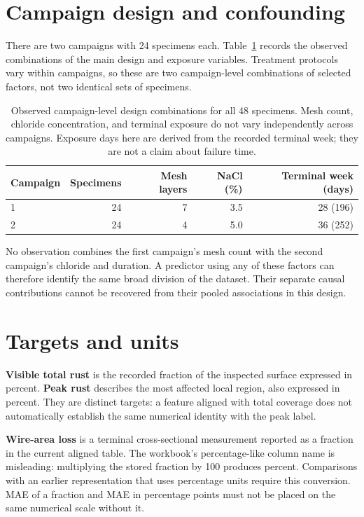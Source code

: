 \section{Campaign design and confounding}
There are two campaigns with 24 specimens each. Table~\ref{tab:design} records the observed combinations of the main design and exposure variables. Treatment protocols vary within campaigns, so these are two campaign-level combinations of selected factors, not two identical sets of specimens.
\begin{table}[htbp]\centering
\caption[Observed campaign design combinations]{Observed campaign-level design combinations for all 48 specimens. Mesh count, chloride concentration, and terminal exposure do not vary independently across campaigns. Exposure days here are derived from the recorded terminal week; they are not a claim about failure time.}\label{tab:design}
\begin{tabular}{lrrrr}\toprule
Campaign & Specimens & Mesh layers & NaCl (\%) & Terminal week (days)\\\midrule
1 & 24 & 7 & 3.5 & 28 (196)\\
2 & 24 & 4 & 5.0 & 36 (252)\\\bottomrule
\end{tabular}
\end{table}
No observation combines the first campaign's mesh count with the second campaign's chloride and duration. A predictor using any of these factors can therefore identify the same broad division of the dataset. Their separate causal contributions cannot be recovered from their pooled associations in this design.

\section{Targets and units}\label{sec:targets}
\textbf{Visible total rust} is the recorded fraction of the inspected surface expressed in percent. \textbf{Peak rust} describes the most affected local region, also expressed in percent. They are distinct targets: a feature aligned with total coverage does not automatically establish the same numerical identity with the peak label.

\textbf{Wire-area loss} is a terminal cross-sectional measurement reported as a fraction in the current aligned table. The workbook's percentage-like column name is misleading: multiplying the stored fraction by 100 produces percent. Comparisons with an earlier representation that uses percentage units require this conversion. MAE of a fraction and MAE in percentage points must not be placed on the same numerical scale without it.

